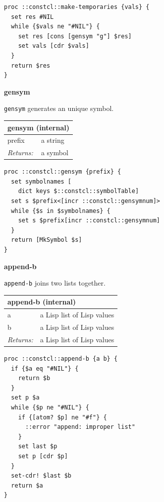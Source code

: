 \documentclass[twoside,9pt]{report}
\begin{document}
\noindent\makebox[\linewidth]{\rule{\linewidth}{0.4pt}}
\begin{lstlisting}
proc ::constcl::make-temporaries {vals} {
  set res #NIL
  while {$vals ne "#NIL"} {
    set res [cons [gensym "g"] $res]
    set vals [cdr $vals]
  }
  return $res
}
\end{lstlisting}
\noindent\makebox[\linewidth]{\rule{\linewidth}{0.4pt}}

\textbf{gensym}


\texttt{gensym} generates an unique symbol.

\begin{tabular}{ |l l| }
\hline
\multicolumn{2}{|l|}{gensym (internal)} \\
\hline
prefix & a string \\
\textit{Returns:} & a symbol \\
\hline
\end{tabular}

\noindent\makebox[\linewidth]{\rule{\linewidth}{0.4pt}}
\begin{lstlisting}
proc ::constcl::gensym {prefix} {
  set symbolnames [
    dict keys $::constcl::symbolTable]
  set s $prefix<[incr ::constcl::gensymnum]>
  while {$s in $symbolnames} {
    set s $prefix[incr ::constcl::gensymnum]
  }
  return [MkSymbol $s]
}
\end{lstlisting}
\noindent\makebox[\linewidth]{\rule{\linewidth}{0.4pt}}

\textbf{append-b}


\texttt{append-b} joins two lists together.

\begin{tabular}{ |l l| }
\hline
\multicolumn{2}{|l|}{append-b (internal)} \\
\hline
a & a Lisp list of Lisp values \\
b & a Lisp list of Lisp values \\
\textit{Returns:} & a Lisp list of Lisp values \\
\hline
\end{tabular}

\noindent\makebox[\linewidth]{\rule{\linewidth}{0.4pt}}
\begin{lstlisting}
proc ::constcl::append-b {a b} {
  if {$a eq "#NIL"} {
    return $b
  }
  set p $a
  while {$p ne "#NIL"} {
    if {[atom? $p] ne "#f"} {
      ::error "append: improper list"
    }
    set last $p
    set p [cdr $p]
  }
  set-cdr! $last $b
  return $a
}
\end{lstlisting}
\noindent\makebox[\linewidth]{\rule{\linewidth}{0.4pt}}
\end{document}
